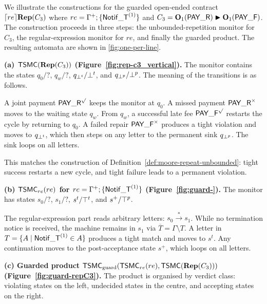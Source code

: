 \begin{example}
\label{ex:open-ended}

We illustrate the constructions for the guarded open-ended contract \(\guard[re]{\repit{C_3}}\) where
\(re = \Gamma^{+};\{\notifterm^{(1)}\}\) and
\(C_3=\obl[1]{\PAY}\repair\obl[1]{\PAYF}\).
The construction proceeds in three steps:
the unbounded-repetition monitor for \(C_3\),
the regular-expression monitor for \(re\),
and finally the guarded product. The resulting automata
are shown in \ref{fig:one-per-line}.

\medskip
\noindent\textbf{(a) \(\tsmc(\repit{C_3})\)
(Figure~\ref{fig:rep-c3_vertical}).}
The monitor contains the states \(q_0/\mathsf{?}\), \(q_w/\mathsf{?}\), \(q_{\bott}/\bott\), and \(q_{\botp}/\botp\). The meaning of the transitions is as follows.

A joint payment \(\PAY^\surd\) keeps the monitor at \(q_0\).
A missed payment \(\PAY^\times\) moves to the waiting state \(q_w\).
From \(q_w\), a successful late fee \(\PAYF^\surd\) restarts the cycle
by returning to \(q_0\). A failed repair \(\PAYF^\times\) produces a tight
violation and moves to \(q_{\bott}\), which then steps on any letter to the
permanent sink \(q_{\botp}\). The sink loops on all letters.

This matches the construction of Definition~\ref{def:moore-repeat-unbounded}:
tight success restarts a new cycle, and tight failure leads to a permanent
violation.

\medskip
\noindent\textbf{(b) \(\tsmc_{re}(re)\) for
\(re = \Gamma^{+};\{\notifterm^{(1)}\}\)
(Figure~\ref{fig:guard-}).}
The monitor has states \(s_0/\mathsf{?}\), \(s_1/\mathsf{?}\), \(s^t/\topt\), and \(s^{+}/\topp\).

The regular-expression part reads arbitrary letters:
\(s_0 \xrightarrow{*} s_1\).
While no termination notice is received, the machine remains in \(s_1\)
via \(\overline{T} = \Gamma \setminus T\).
A letter in \(T=\{A\mid \notifterm^{(1)}\in A\}\) produces a tight match
and moves to \(s^t\). Any continuation moves to the post-acceptance state
\(s^{+}\), which loops on all letters.

\medskip
\noindent\textbf{(c) Guarded product
\(\tsmc_\guardd(\tsmc_{re}(re),\tsmc(\repit{C_3}))\)
(Figure~\ref{fig:guard-repC3}).}
The product is organised by verdict class:
violating states on the left, undecided states in the centre, and
accepting states on the right.


\end{example}
